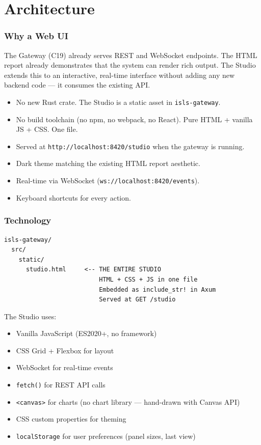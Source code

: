 \documentclass[11pt,a4paper,twoside]{article}
\begin{document}
\part{Architecture}\label{part:arch}

\section{Why a Web UI}\label{sec:why}

The Gateway (C19) already serves REST and WebSocket endpoints. The
HTML report already demonstrates that the system can render rich
output. The Studio extends this to an interactive, real-time
interface without adding any new backend code --- it consumes the
existing API.

\begin{itemize}[nosep]
  \item No new Rust crate. The Studio is a static asset in
        \texttt{isls-gateway}.
  \item No build toolchain (no npm, no webpack, no React). Pure
        HTML + vanilla JS + CSS. One file.
  \item Served at \texttt{http://localhost:8420/studio} when
        the gateway is running.
  \item Dark theme matching the existing HTML report aesthetic.
  \item Real-time via WebSocket (\texttt{ws://localhost:8420/events}).
  \item Keyboard shortcuts for every action.
\end{itemize}

\section{Technology}\label{sec:tech}

\begin{lstlisting}[title={No build step. One file.}]
isls-gateway/
  src/
    static/
      studio.html     <-- THE ENTIRE STUDIO
                          HTML + CSS + JS in one file
                          Embedded as include_str! in Axum
                          Served at GET /studio
\end{lstlisting}

The Studio uses:
\begin{itemize}[nosep]
  \item Vanilla JavaScript (ES2020+, no framework)
  \item CSS Grid + Flexbox for layout
  \item WebSocket for real-time events
  \item \texttt{fetch()} for REST API calls
  \item \texttt{<canvas>} for charts (no chart library ---
        hand-drawn with Canvas API)
  \item CSS custom properties for theming
  \item \texttt{localStorage} for user preferences (panel sizes,
        last view)
\end{itemize}
\end{document}
